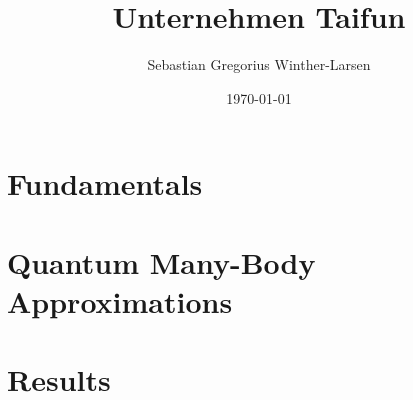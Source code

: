 \documentclass[twoside, english, notitlepage, 10pt]{uiofysmaster}
\author{Sebastian Gregorius Winther-Larsen}
\title{Unternehmen Taifun}
\date{\today}
\begin{document}
\frontmatter
    \maketitle

    \setcounter{tocdepth}{1}
    \tableofcontents

\mainmatter

    \part{Fundamentals}

        
        

    \part{Quantum Many-Body Approximations}

        
        

    \part{Results}

        

    \appendix

        

        
\printbibliography
\end{document}
